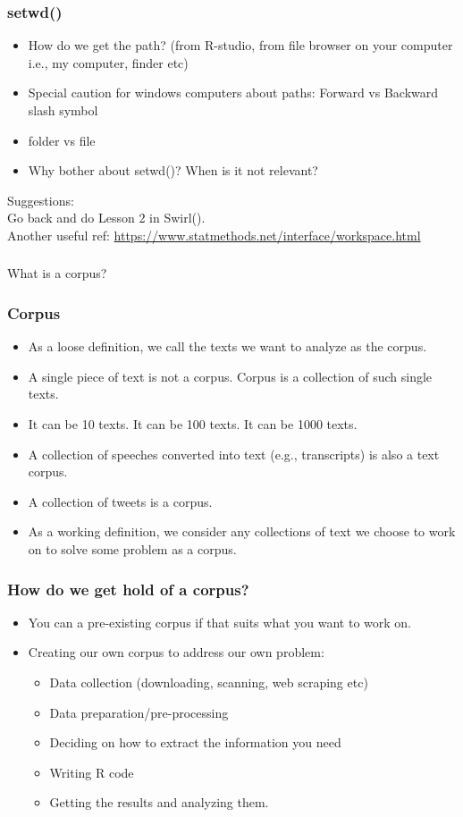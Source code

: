 \documentclass{beamer}
\begin{document}
\begin{frame}
\frametitle{setwd()}
\begin{itemize}
\item How do we get the path? (from R-studio, from file browser on your computer i.e., my computer, finder etc)
\item Special caution for windows computers about paths: Forward vs Backward slash symbol
\item folder vs file
\item Why bother about setwd()? When is it not relevant? 
\end{itemize} \pause
Suggestions: \\
Go back and do Lesson 2 in Swirl(). \\ Another useful ref:  
\url{https://www.statmethods.net/interface/workspace.html}
\end{frame}


\begin{frame}
\frametitle{}
\centering What is a corpus?
\end{frame}

\begin{frame}
\frametitle{Corpus}
\begin{itemize}
\item As a loose definition, we call the texts we want to analyze as the corpus.
\item A single piece of text is not a corpus. Corpus is a collection of such single texts. 
\item It can be 10 texts. It can be 100 texts. It can be 1000 texts. \pause
\item A collection of speeches converted into text (e.g., transcripts) is also a text corpus.
\item A collection of tweets is a corpus. \pause
\item As a working definition, we consider any collections of text we choose to work on to solve some problem as a corpus. 
\end{itemize}
\end{frame}

\begin{frame}
\frametitle{How do we get hold of a corpus?}
\begin{itemize}
\item You can a pre-existing corpus if that suits what you want to work on. 
\item Creating our own corpus to address our own problem:
\begin{itemize}
\item Data collection (downloading, scanning, web scraping etc)
\item Data preparation/pre-processing
\item Deciding on how to extract the information you need
\item Writing R code
\item Getting the results and analyzing them.
\end{itemize}
\end{itemize}
\end{frame}
\end{document}
